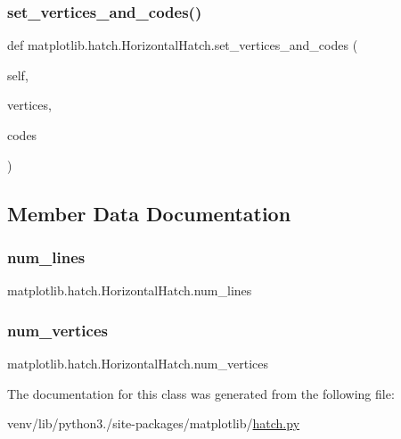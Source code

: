 \subsubsection{\texorpdfstring{set\+\_\+vertices\+\_\+and\+\_\+codes()}{set\_vertices\_and\_codes()}}
{\footnotesize\ttfamily def matplotlib.\+hatch.\+Horizontal\+Hatch.\+set\+\_\+vertices\+\_\+and\+\_\+codes (\begin{DoxyParamCaption}\item[{}]{self,  }\item[{}]{vertices,  }\item[{}]{codes }\end{DoxyParamCaption})}



\subsection{Member Data Documentation}
\mbox{\label{classmatplotlib_1_1hatch_1_1HorizontalHatch_ac1a2105e70d6648e76bf1b0ab38f1d22}} 
\subsubsection{\texorpdfstring{num\+\_\+lines}{num\_lines}}
{\footnotesize\ttfamily matplotlib.\+hatch.\+Horizontal\+Hatch.\+num\+\_\+lines}

\mbox{\label{classmatplotlib_1_1hatch_1_1HorizontalHatch_a58433cb80a9e3d159e051529c96b2c55}} 
\subsubsection{\texorpdfstring{num\+\_\+vertices}{num\_vertices}}
{\footnotesize\ttfamily matplotlib.\+hatch.\+Horizontal\+Hatch.\+num\+\_\+vertices}



The documentation for this class was generated from the following file\+:\begin{DoxyCompactItemize}
\item 
venv/lib/python3./site-\/packages/matplotlib/\hyperlink{hatch_8py}{hatch.\+py}\end{DoxyCompactItemize}
